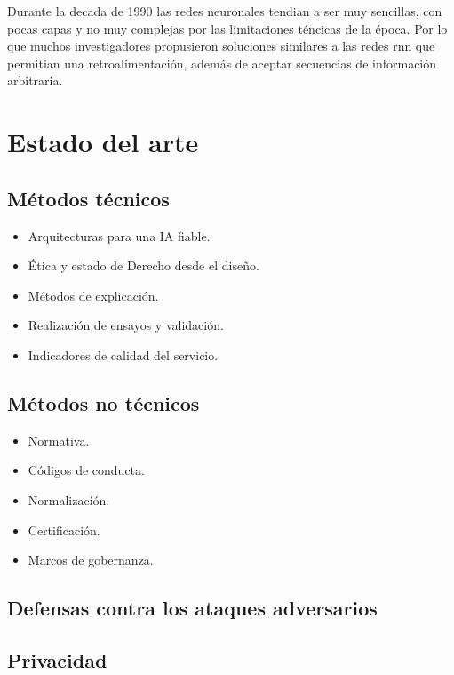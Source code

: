 Durante la decada de 1990 las redes neuronales tendian a ser muy sencillas, con pocas capas y no muy complejas por las limitaciones téncicas de la época.
Por lo que muchos investigadores propusieron soluciones similares a las redes \acrshort{rnn} que permitian una retroalimentación, además de aceptar secuencias de información arbitraria.



\section{Estado del arte}

\subsection{Métodos técnicos}
\begin{itemize}
    \item Arquitecturas para una IA fiable.
    \item Ética y estado de Derecho desde el diseño.
    \item Métodos de explicación.
    \item Realización de ensayos y validación.
    \item Indicadores de calidad del servicio.
\end{itemize}

\subsection{Métodos no técnicos}
\begin{itemize}
    \item Normativa.
    \item Códigos de conducta.
    \item Normalización.
    \item Certificación.
    \item Marcos de gobernanza.
\end{itemize}

\subsection{Defensas contra los ataques adversarios}

\subsection{Privacidad}

